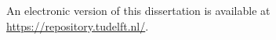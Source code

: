 \begin{titlepage}
\vspace{\bigskipamount}



\noindent
An electronic version of this dissertation is available at \\
\url{https://repository.tudelft.nl/}.


\end{titlepage}
